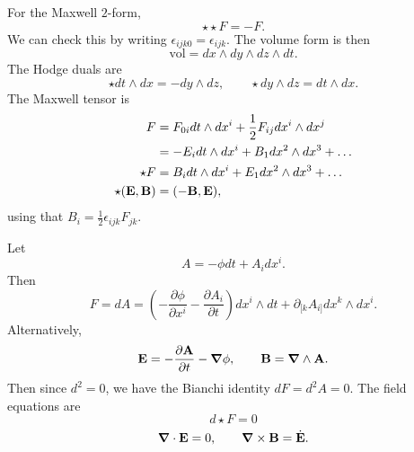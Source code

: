 \begin{example}[$n = 4, t = 1, p = 2$]
  For the Maxwell $2$-form, 
  \begin{equation}
    \star \star F = - F.
  \end{equation}
  We can check this by writing $\epsilon_{ijk0} = \epsilon_{ijk}$. The volume form is then 
  \begin{equation}
    \text{vol} = dx \wedge dy \wedge dz \wedge dt.
  \end{equation}
  The Hodge duals are
  \begin{equation}
    \star dt \wedge dx =  -dy \wedge dz, \qquad \star dy \wedge dz = dt \wedge dx.
  \end{equation}
  The Maxwell tensor is
  \begin{align}
    F &= F_{0i} dt \wedge dx^i + \frac{1}{2} F_{ij} dx^{i} \wedge dx^{j} \\
    &= -E_i dt \wedge dx^{i} + B_1 dx^2 \wedge dx^3 + \dots \\
    \star F &= B_i dt \wedge dx^{i} + E_1 dx^2 \wedge dx^3 + \dots \\
    \star (\vb{E}, \vb{B}) &= (-\vb{B}, \vb{E}), 
  \end{align}
  using that $B_i = \frac{1}{2} \epsilon_{ijk} F_{jk}$.

  Let 
  \begin{equation}
    A = - \phi dt + A_i dx^{i}.
  \end{equation}
  Then 
  \begin{equation}
    F = dA = \left( - \frac{\partial \phi}{\partial x^{i}} - \frac{\partial A_{i}}{\partial t} \right) dx^{i} \wedge dt + \partial_{[k} A_{i]} dx^{k} \wedge dx^{i}.
  \end{equation}
  Alternatively,
  \begin{equation}
    \vb{E} = - \frac{\partial \vb{A}}{\partial t} - \boldsymbol \nabla \phi, \qquad \vb{B} = \boldsymbol \nabla \wedge \vb{A}.
  \end{equation}
  Then since $d^2 = 0$, we have the Bianchi identity $dF = d^2 A = 0$.
  The field equations are
  \begin{equation}
    d \star F = 0
  \end{equation}
  \begin{equation}
    \boldsymbol \nabla \cdot \vb{E} = 0, \qquad \boldsymbol \nabla \times \vb{B} = \dot{\vb{E}}.
  \end{equation}
\end{example}

